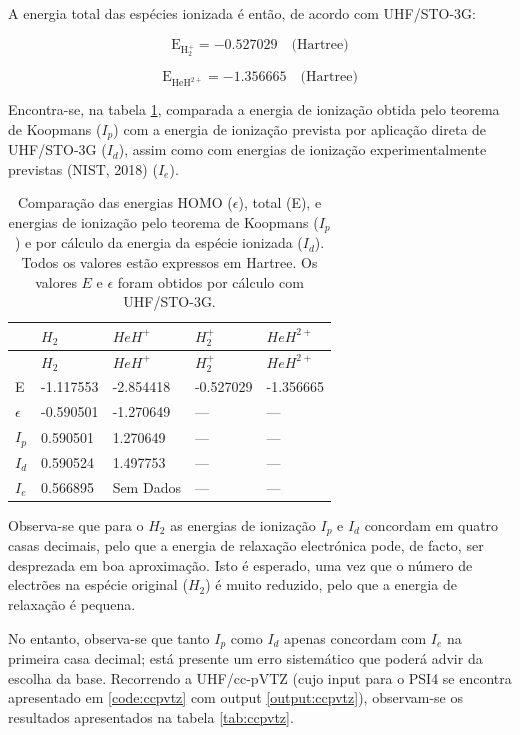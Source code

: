 \documentclass[portuguese,]{article}
\begin{document}
A energia total das espécies ionizada é então, de acordo com UHF/STO-3G:

\[ \text{E}_{\text{H}_2^+} = -0.527029 \quad \text{(Hartree)} \]

\[ \text{E}_{\text{HeH}^{2+}} = -1.356665 \quad \text{(Hartree)} \]

Encontra-se, na tabela \ref{tab:ionenergies}, comparada a energia de
ionização obtida pelo teorema de Koopmans (\(I_p\)) com a energia de
ionização prevista por aplicação direta de UHF/STO-3G (\(I_d\)), assim
como com energias de ionização experimentalmente previstas (NIST, 2018)
(\(I_e\)).

\begin{longtable}[]{@{}lllll@{}}
\caption{Comparação das energias HOMO (\(\epsilon\)), total (E), e
energias de ionização pelo teorema de Koopmans (\(I_p\)) e por cálculo
da energia da espécie ionizada (\(I_d\)). Todos os valores estão
expressos em Hartree. Os valores \(E\) e \(\epsilon\) foram obtidos por
cálculo com UHF/STO-3G. \label{tab:ionenergies}}\tabularnewline
\toprule
& \(H_2\) & \(HeH^+\) & \(H_2^+\) & \(HeH^{2+}\)\tabularnewline
\midrule
\endfirsthead
\toprule
& \(H_2\) & \(HeH^+\) & \(H_2^+\) & \(HeH^{2+}\)\tabularnewline
\midrule
\endhead
E & -1.117553 & -2.854418 & -0.527029 & -1.356665\tabularnewline
\(\epsilon\) & -0.590501 & -1.270649 & --- & ---\tabularnewline
\(I_p\) & 0.590501 & 1.270649 & --- & ---\tabularnewline
\(I_d\) & 0.590524 & 1.497753 & --- & ---\tabularnewline
\(I_e\) & 0.566895 & Sem Dados & --- & ---\tabularnewline
\bottomrule
\end{longtable}

\pagebreak

Observa-se que para o \(H_2\) as energias de ionização \(I_p\) e \(I_d\)
concordam em quatro casas decimais, pelo que a energia de relaxação
electrónica pode, de facto, ser desprezada em boa aproximação. Isto é
esperado, uma vez que o número de electrões na espécie original
(\(H_2\)) é muito reduzido, pelo que a energia de relaxação é pequena.

No entanto, observa-se que tanto \(I_p\) como \(I_d\) apenas concordam
com \(I_e\) na primeira casa decimal; está presente um erro sistemático
que poderá advir da escolha da base. Recorrendo a UHF/cc-pVTZ (cujo
input para o PSI4 se encontra apresentado em \ref{code:ccpvtz} com
output \ref{output:ccpvtz}), observam-se os resultados apresentados na
tabela \ref{tab:ccpvtz}.
\end{document}
